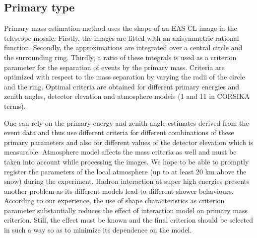 \documentclass[a4paper,11pt]{article}
\begin{document}
\subsection{Primary type}


Primary mass estimation method uses the shape of an EAS CL image in the telescope mosaic. Firstly, the images are fitted with an axisymmetric rational function. Secondly, the approximations are integrated over a central circle and the surrounding ring. Thirdly, a ratio of these integrals is used as a criterion parameter for the separation of events by the primary mass. Criteria are optimized with respect to the mass separation by varying the radii of the circle and the ring. Optimal criteria are obtained for different primary energies and zenith angles, detector elevation and atmosphere models (1 and 11 in CORSIKA terms).

One can rely on the primary energy and zenith angle estimates derived from the event data and thus use different criteria for different combinations of these primary parameters and also for different values of the detector elevation which is measurable. Atmosphere model affects the mass criteria as well and must be taken into account while processing the images.
We hope to be able to promptly register the parameters of the local atmosphere (up to at least 20 km above the snow) during the experiment. Hadron interaction at super high energies presents another problem as its different models lead to different shower behaviours. According to our experience, the use of shape characteristics as criterion parameter substantially reduces the effect of interaction model on primary mass criterion. Still, the effect must be known and the final criterion should be selected in such a way so as to minimize its dependence on the model.
\end{document}
